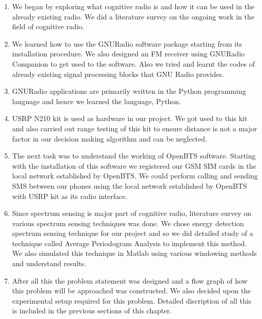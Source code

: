 \begin{enumerate}

\item We began by exploring what cognitive radio is and how it can be used 
in the already existing radio. We did a literature survey on the ongoing work in the
field of cognitive radio.

\item We learned how to use the GNURadio software package starting from its installation procedure. We 
also designed an FM receiver using GNURadio Companion to get used to the software. 
Also we tried and learnt the codes of already existing signal processing blocks 
that GNU Radio provides.

\item GNURadio applications are primarily written in the Python programming 
language and hence we learned the language, Python.

\item USRP N210 kit is used as hardware in our project. We got used to this kit and 
also carried out range testing of this kit to ensure distance is not a major factor in 
our decision making algorithm and can be neglected.
\item The next task was to understand the working of OpenBTS software. Starting 
with the installation of this software we registered our GSM SIM cards in the 
local network established by OpenBTS. We could perform calling and sending SMS
between our phones using the local network established by OpenBTS with USRP 
kit as its radio interface.
\item Since spectrum sensing is major part of cognitive radio, literature survey 
on various spectrum sensing techniques was done. We chose energy detection 
spectrum sensing technique for our project and so we did detailed study of a 
technique called Average Periodogram Analysis to implement this method. We also 
simulated this technique in Matlab using various windowing methods and 
understand results. 
\item After all this the problem statement was designed and a flow graph of 
how this problem will be approached was constructed. We also decided upon the 
experimental setup required for this problem. Detailed discription of all this
is included in the previous sections of this chapter. 
 

\end{enumerate}
